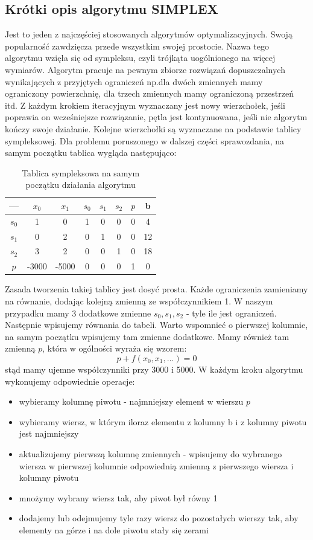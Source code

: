 \documentclass[10pt,a4paper]{article}
\begin{document}
\subsection{Krótki opis algorytmu SIMPLEX}
Jest to jeden z najczęściej stosowanych algorytmów optymalizacyjnych. Swoją popularność 
zawdzięcza przede wszystkim swojej prostocie. Nazwa tego algorytmu wzięła się od sympleksu, czyli
trójkąta uogólnionego na więcej wymiarów. Algorytm pracuje na pewnym zbiorze rozwiązań
dopuszczalnych wynikających z przyjętych ograniczeń np.dla dwóch zmiennych mamy ograniczony 
powierzchnię, dla trzech zmiennych mamy ograniczoną przestrzeń itd. Z każdym krokiem
iteracyjnym wyznaczany jest nowy wierzchołek, jeśli poprawia on wcześniejsze rozwiązanie, pętla
jest kontynuowana, jeśli nie algorytm kończy swoje działanie. Kolejne wierzchołki są wyznaczane
na podstawie tablicy sympleksowej. Dla problemu poruszonego w dalszej części sprawozdania, na 
samym początku tablica wygląda następująco:

\begin{table}[ht]
\centering
\begin{tabular}{|c|c|c|c|c|c|c|c|}
\hline
 ---& $x_0$ & $x_1$ & $s_0$ & $s_1$ & $s_2$ & $p$ & b\\
\hline
$s_0$ & 1 & 0 & 1 & 0 & 0 & 0 & 4\\
\hline
$s_1$ & 0 & 2 & 0 & 1 & 0 & 0 & 12\\
\hline 
$s_2$ & 3 & 2 & 0 & 0 & 1 & 0 & 18\\
\hline
$p$ & -3000 & -5000 & 0 & 0 & 0 & 1 & 0\\
\hline
\end{tabular}
\caption{Tablica sympleksowa na samym początku działania algorytmu}
\end{table}

Zasada tworzenia takiej tablicy jest dosyć prosta. Każde ograniczenia zamieniamy na równanie, 
dodając kolejną zmienną ze współczynnikiem 1. W naszym przypadku mamy 3 dodatkowe zmienne 
$s_0,s_1,s_2$ - tyle ile jest ograniczeń. Następnie wpisujemy równania do tabeli. Warto wspomnieć
o pierwszej kolumnie, na samym początku wpisujemy tam zmienne dodatkowe. Mamy również tam zmienną
$p$, która w ogólności wyraża się wzorem: 
\begin{equation*}
p+f(x_0,x_1,...)=0
\end{equation*}
stąd mamy ujemne współczynniki przy 3000 i 5000. W każdym kroku algorytmu wykonujemy odpowiednie 
operacje:
\begin{itemize}
\item wybieramy kolumnę piwotu - najmniejszy element w wierszu $p$
\item wybieramy wiersz, w którym iloraz elementu z kolumny b i z kolumny piwotu jest najmniejszy
\item aktualizujemy pierwszą kolumnę zmiennych - wpisujemy do wybranego wiersza w pierwszej 
kolumnie odpowiednią zmienną z pierwszego wiersza i kolumny piwotu
\item mnożymy wybrany wiersz tak, aby piwot był równy 1
\item dodajemy lub odejmujemy tyle razy wiersz do pozostałych wierszy tak, aby elementy na górze 
i na dole piwotu stały się zerami
\end{itemize}
\end{document}
